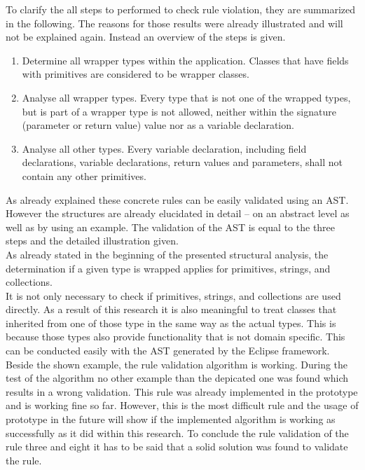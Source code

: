 To clarify the all steps to performed to check rule violation, they are summarized in the following. The reasons for those results were already illustrated and will not be explained again. Instead an overview of the steps is given.
\begin{enumerate}
  \item Determine all wrapper types within the application. Classes that have fields with primitives are considered to be wrapper classes.
  \item Analyse all wrapper types. Every type that is not one of the wrapped types, but is part of a wrapper type is not allowed, neither within the signature (parameter or return value) value nor as a variable declaration.
  \item Analyse all other types. Every variable declaration, including field declarations, variable declarations, return values and parameters, shall not contain any other primitives. 
\end{enumerate}

As already explained these concrete rules can be easily validated using an \acf{AST}. However the structures are already elucidated in detail -- on an abstract level as well as by using an example. The validation of the \acf{AST} is equal to the three steps and the detailed illustration given.
\\

As already stated in the beginning of the presented structural analysis, the determination if a given type is wrapped applies for primitives, strings, and collections. 
\\

It is not only necessary to check if primitives, strings, and collections are used directly. As a result of this research it is also meaningful to treat classes that inherited from one of those type in the same way as the actual types. This is because those types also provide functionality that is not domain specific. This can be conducted easily with the \acf{AST} generated by the Eclipse framework. 
\\

Beside the shown example, the rule validation algorithm is working. During the test of the algorithm no other example than the depicated one was found which results in a wrong validation. This rule was already implemented in the prototype and is working fine so far. However, this is the most difficult rule and the usage of prototype in the future will show if the implemented algorithm is working as successfully as it did within this research. To conclude the rule validation of the rule three and eight it has to be said that a solid solution was found to validate the rule.
\\

